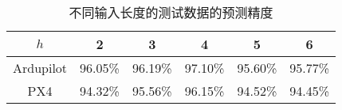 \begin{table}[ht]
\caption{不同输入长度的测试数据的预测精度}
\label{tab:range_acc}
\centering
\begin{threeparttable}
\begin{tabular}{c|ccccc}
        \toprule[1.5pt]
        $h$  & 2 & 3 & 4 & 5 & 6 \\
        \midrule
        

        Ardupilot  & 96.05\% & 96.19\% & 97.10\% & 95.60\% & 95.77\% \\

        PX4 & 94.32\% & 95.56\% & 96.15\%  & 94.52\% & 94.45\% \\

        \bottomrule[1.5pt]
\end{tabular}
\end{threeparttable}
\end{table}
